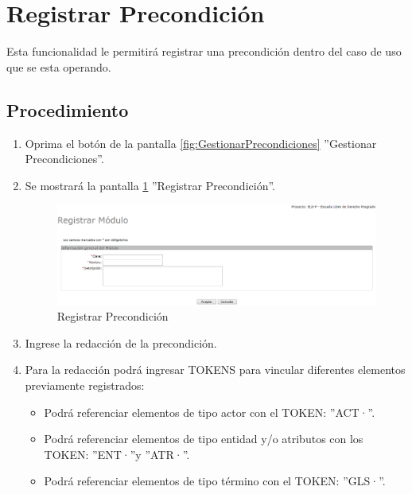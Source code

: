 
\hypertarget{cv:registrarPrecondicion}{\section{Registrar Precondición}} \label{sec:registrarPrecondicion}

	Esta funcionalidad le permitirá registrar una precondición dentro del caso de uso que se esta operando.

		\subsection{Procedimiento}

			\begin{enumerate}
	
			\item Oprima el botón \IURegistrar{} de la pantalla \ref{fig:GestionarPrecondiciones} ''Gestionar Precondiciones''.
			
			\item Se mostrará la pantalla \ref{fig:registrarPrecondicion} ''Registrar Precondición''.

			\begin{figure}[htbp!]
				\begin{center}
					\includegraphics[scale=0.5]{roles/lider/casosUso/pantallas/IU5-1registrarModulo}
					\caption{Registrar Precondición}
					\label{fig:registrarPrecondicion}
				\end{center}
			\end{figure}
		
			\item Ingrese la redacción de la precondición.
			
			\item Para la redacción podrá ingresar TOKENS para vincular diferentes elementos previamente registrados:
			
			\begin{itemize}
				\item Podrá referenciar elementos de tipo actor con el TOKEN: ''ACT·''.
				\item Podrá referenciar elementos de tipo entidad y/o atributos con los TOKEN: ''ENT·''y ''ATR·''.
				\item Podrá referenciar elementos de tipo término con el TOKEN: ''GLS·''.
			\end{itemize}
			

\end{enumerate}
